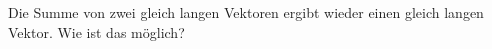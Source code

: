 Die Summe von zwei gleich langen Vektoren ergibt wieder einen gleich langen Vektor. Wie ist das möglich?
